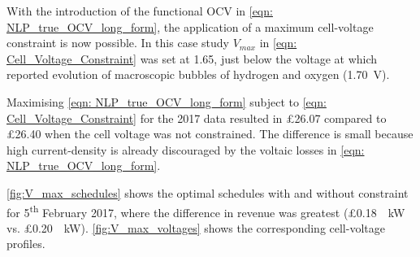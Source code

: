 \documentclass[preprint,3p,review,authoryear,10pt]{elsarticle}
\begin{document}
With the introduction of the functional OCV in \cref{eqn: NLP_true_OCV_long_form}, the application of a maximum cell-voltage constraint is now possible. In this case study $V_{max}$ in \cref{eqn: Cell_Voltage_Constraint} was set at 1.65, just below the voltage at which \cite{Wei2017} reported evolution of macroscopic bubbles of hydrogen and oxygen (\SI{1.70}{\volt}). 

Maximising \cref{eqn: NLP_true_OCV_long_form} subject to \cref{eqn: Cell_Voltage_Constraint} for the 2017 data resulted in \pounds 26.07 compared to \pounds 26.40 when the cell voltage was not constrained. The difference is small because high current-density is already discouraged by the voltaic losses in \cref{eqn: NLP_true_OCV_long_form}. 

\cref{fig:V_max_schedules} shows the optimal schedules with and without constraint for 5\textsuperscript{th} February 2017, where the difference in revenue was greatest (\pounds \SI{0.18}{\per\kilo\watt} vs. \pounds \SI{0.20}{\per\kilo\watt}). \cref{fig:V_max_voltages} shows the corresponding cell-voltage profiles.
\end{document}
